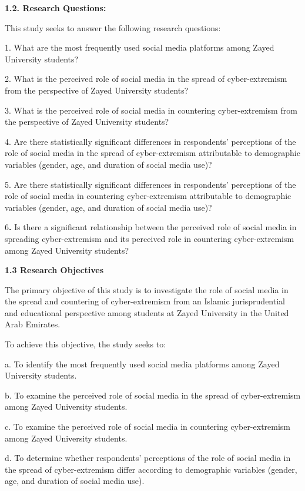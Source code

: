\documentclass[11pt,a4paper]{article}
\begin{document}
	\textbf{1.2. Research Questions:}
	
	This study seeks to answer the following research questions:
	
	1. What are the most frequently used social media platforms among Zayed University students?
	
	2. What is the perceived role of social media in the spread of cyber-extremism from the perspective of Zayed University students?
	
	3. What is the perceived role of social media in countering cyber-extremism from the perspective of Zayed University students?
	
	4. Are there statistically significant differences in respondents' perceptions of the role of social media in the spread of cyber-extremism attributable to demographic variables (gender, age, and duration of social media use)?
	
	5. Are there statistically significant differences in respondents' perceptions of the role of social media in countering cyber-extremism attributable to demographic variables (gender, age, and duration of social media use)?
	
	6\textbf{.} Is there a significant relationship between the perceived role of social media in spreading cyber-extremism and its perceived role in countering cyber-extremism among Zayed University students?
	
	\textbf{1.3 Research Objectives}
	
	The primary objective of this study is to investigate the role of social media in the spread and countering of cyber-extremism from an Islamic jurisprudential and educational perspective among students at Zayed University in the United Arab Emirates.
	
	To achieve this objective, the study seeks to:
	
	a. To identify the most frequently used social media platforms among Zayed University students.
	
	b. To examine the perceived role of social media in the spread of cyber-extremism among Zayed University students.
	
	c. To examine the perceived role of social media in countering cyber-extremism among Zayed University students.
	
	d. To determine whether respondents' perceptions of the role of social media in the spread of cyber-extremism differ according to demographic variables (gender, age, and duration of social media use).
	
\end{document}
